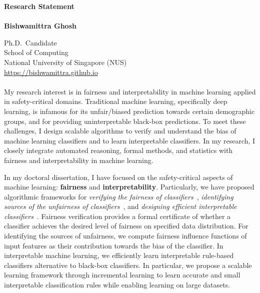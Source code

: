 \documentclass{article}
\newcommand{\blue}[1]{\textcolor{blue}{#1}}
\begin{document}
	\noindent\huge \textbf{Research Statement} \\
	\vspace{0.1em}\\
	\Large \textbf{Bishwamittra Ghosh}
		
	\normalsize
	\noindent Ph.D.\ Candidate\\
	School of Computing\\
	National University of Singapore (NUS)\\
	\blue{\url{https://bishwamittra.github.io}}



	\paragraph{}
	My research interest is in fairness and interpretability in machine learning applied in safety-critical domains. Traditional machine learning, specifically deep learning, is infamous for its unfair/biased prediction towards certain demographic groups, and for providing uninterpretable black-box predictions. To meet these challenges, I design scalable algorithms to verify and understand the bias of machine learning classifiers and to learn interpretable classifiers. In my research, I closely integrate automated reasoning, formal methods, and statistics with fairness and interpretability in machine learning.
	
	
	
	In my doctoral dissertation, I have focused on the safety-critical aspects of machine learning: \textbf{fairness} and \textbf{interpretability}. Particularly, we have proposed algorithmic frameworks for \emph{verifying the fairness of classifiers}~\cite{ghosh2021justicia,ghosh2022algorithmic}, \emph{identifying sources of the unfairness of classifiers}~\cite{ghosh2022how}, and \emph{designing efficient interpretable classifiers}~\cite{ghosh22efficient,ghosh2019incremental,ghosh2020classification}. Fairness verification provides a formal certificate of whether a classifier achieves the desired level of fairness on specified data distribution. For identifying the sources of unfairness, we compute fairness influence functions of input features as their contribution towards the bias of the classifier. In interpretable machine learning, we efficiently learn interpretable rule-based classifiers alternative to black-box classifiers. In particular, we propose a scalable learning framework through incremental learning to learn accurate and small interpretable classification rules while enabling learning on large datasets.
	
\end{document}
